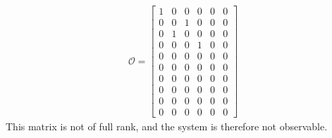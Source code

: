 \begin{align*}
\mathcal{O} =
\begin{bmatrix}
    1 & 0 & 0 & 0 & 0 & 0\\
    0 & 0 & 1 & 0 & 0 & 0\\
    0 & 1 & 0 & 0 & 0 & 0\\
    0 & 0 & 0 & 1 & 0 & 0\\
    0 & 0 & 0 & 0 & 0 & 0\\
    0 & 0 & 0 & 0 & 0 & 0\\
    0 & 0 & 0 & 0 & 0 & 0\\
    0 & 0 & 0 & 0 & 0 & 0\\
    0 & 0 & 0 & 0 & 0 & 0\\
    0 & 0 & 0 & 0 & 0 & 0
\end{bmatrix}
\end{align*}
This matrix is not of full rank, and the system is therefore not observable.